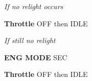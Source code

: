 \begin{tableitemize}
{    \emph{If no relight occurs}
    \begin{subenumerate}[start=4]
        \item \textbf{Throttle} \dotfill OFF then IDLE
    \end{subenumerate}

    \emph{If still no relight}
    \begin{subenumerate}[start=5]
        \item \textbf{ENG MODE} \dotfill SEC
        \item \textbf{Throttle} \dotfill OFF then IDLE
    \end{subenumerate}}
\end{tableitemize}

\cleardoublepage